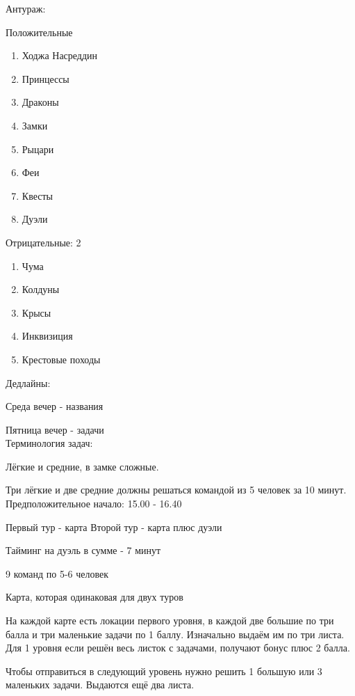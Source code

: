 \documentclass[a4paper,12pt]{article}
\author{}
\title{}
\date{\today}
\begin{document}

Антураж:

Положительные\\

\begin{enumerate}
\item Ходжа Насреддин
\item Принцессы
\item Драконы
\item Замки
\item Рыцари
\item Феи
\item Квесты
\item Дуэли
\end{enumerate}

Отрицательные:
2
\begin{enumerate}
\item Чума
\item Колдуны
\item Крысы
\item Инквизиция
\item Крестовые походы
\end{enumerate}

Дедлайны:

Среда вечер - названия

Пятница вечер - задачи\\

Терминология задач:

Лёгкие и средние, в замке сложные.

Три лёгкие и две средние должны решаться командой из 5 человек за 10 минут.
\\

Предположительное начало: 15.00 - 16.40

Первый тур - карта
Второй тур - карта плюс дуэли

Тайминг на дуэль в сумме - 7 минут

9 команд по 5-6 человек



Карта, которая одинаковая для двух туров

На каждой карте есть локации первого уровня, в каждой две большие по три балла и три маленькие задачи по 1 баллу. Изначально выдаём им по три листа. Для 1 уровня если решён весь листок с задачами, получают бонус плюс 2 балла.


 Чтобы отправиться в следующий уровень нужно решить 1 большую или 3 маленьких задачи. Выдаются ещё два листа.
\end{document}
